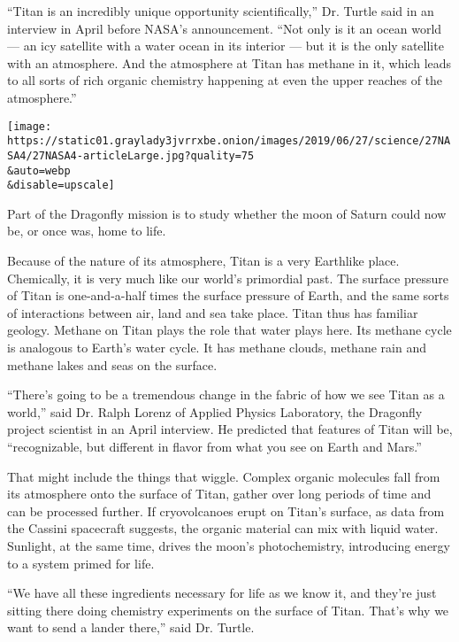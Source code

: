 ``Titan is an incredibly unique opportunity scientifically,'' Dr. Turtle
said in an interview in April before NASA's announcement. ``Not only is
it an ocean world --- an icy satellite with a water ocean in its
interior --- but it is the only satellite with an atmosphere. And the
atmosphere at Titan has methane in it, which leads to all sorts of rich
organic chemistry happening at even the upper reaches of the
atmosphere.''

\texttt{[image: https://static01.graylady3jvrrxbe.onion/images/2019/06/27/science/27NASA4/27NASA4-articleLarge.jpg?quality=75\\\&auto=webp\\\&disable=upscale]}

Part of the Dragonfly mission is to study whether the moon of Saturn
could now be, or once was, home to life.

Because of the nature of its atmosphere, Titan is a very Earthlike
place. Chemically, it is very much like our world's primordial past. The
surface pressure of Titan is one-and-a-half times the surface pressure
of Earth, and the same sorts of interactions between air, land and sea
take place. Titan thus has familiar geology. Methane on Titan plays the
role that water plays here. Its methane cycle is analogous to Earth's
water cycle. It has methane clouds, methane rain and methane lakes and
seas on the surface.

``There's going to be a tremendous change in the fabric of how we see
Titan as a world,'' said Dr. Ralph Lorenz of Applied Physics Laboratory,
the Dragonfly project scientist in an April interview. He predicted that
features of Titan will be, ``recognizable, but different in flavor from
what you see on Earth and Mars.''

That might include the things that wiggle. Complex organic molecules
fall from its atmosphere onto the surface of Titan, gather over long
periods of time and can be processed further. If cryovolcanoes erupt on
Titan's surface, as data from the Cassini spacecraft suggests, the
organic material can mix with liquid water. Sunlight, at the same time,
drives the moon's photochemistry, introducing energy to a system primed
for life.

``We have all these ingredients necessary for life as we know it, and
they're just sitting there doing chemistry experiments on the surface of
Titan. That's why we want to send a lander there,'' said Dr. Turtle.

\href{https://www.nytimes3xbfgragh.onion/interactive/2017/09/14/science/cassini-saturn-images.html}{}

